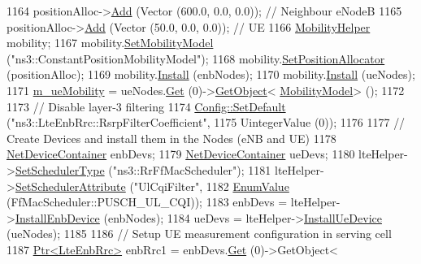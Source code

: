 \begin{DoxyCode}
1164   positionAlloc->\hyperlink{classns3_1_1ListPositionAllocator_a460e82f015ac012a73ba0ea0cccb3486}{Add} (Vector (600.0, 0.0, 0.0)); \textcolor{comment}{// Neighbour eNodeB}
1165   positionAlloc->\hyperlink{classns3_1_1ListPositionAllocator_a460e82f015ac012a73ba0ea0cccb3486}{Add} (Vector (50.0, 0.0, 0.0)); \textcolor{comment}{// UE}
1166   \hyperlink{classns3_1_1MobilityHelper}{MobilityHelper} mobility;
1167   mobility.\hyperlink{classns3_1_1MobilityHelper_a030275011b6f40682e70534d30280aba}{SetMobilityModel} (\textcolor{stringliteral}{"ns3::ConstantPositionMobilityModel"});
1168   mobility.\hyperlink{classns3_1_1MobilityHelper_ac59d5295076be3cc11021566713a28c5}{SetPositionAllocator} (positionAlloc);
1169   mobility.\hyperlink{classns3_1_1MobilityHelper_a07737960ee95c0777109cf2994dd97ae}{Install} (enbNodes);
1170   mobility.\hyperlink{classns3_1_1MobilityHelper_a07737960ee95c0777109cf2994dd97ae}{Install} (ueNodes);
1171   \hyperlink{classLteUeMeasurementsPiecewiseTestCase2_a085c911b012df1a52dde2bb903ba56e3}{m\_ueMobility} = ueNodes.\hyperlink{classns3_1_1NodeContainer_a9ed96e2ecc22e0f5a3d4842eb9bf90bf}{Get} (0)->\hyperlink{classns3_1_1Object_a13e18c00017096c8381eb651d5bd0783}{GetObject}<
      \hyperlink{classns3_1_1MobilityModel}{MobilityModel}> ();
1172 
1173   \textcolor{comment}{// Disable layer-3 filtering}
1174   \hyperlink{group__config_ga2e7882df849d8ba4aaad31c934c40c06}{Config::SetDefault} (\textcolor{stringliteral}{"ns3::LteEnbRrc::RsrpFilterCoefficient"},
1175                       UintegerValue (0));
1176 
1177   \textcolor{comment}{// Create Devices and install them in the Nodes (eNB and UE)}
1178   \hyperlink{classns3_1_1NetDeviceContainer}{NetDeviceContainer} enbDevs;
1179   \hyperlink{classns3_1_1NetDeviceContainer}{NetDeviceContainer} ueDevs;
1180   lteHelper->\hyperlink{classns3_1_1LteHelper_a8f86e55b8b80a81732c4b2df00fb25d5}{SetSchedulerType} (\textcolor{stringliteral}{"ns3::RrFfMacScheduler"});
1181   lteHelper->\hyperlink{classns3_1_1LteHelper_a38f8c7f4592b31c0f3dedb53e7909742}{SetSchedulerAttribute} (\textcolor{stringliteral}{"UlCqiFilter"},
1182                                     \hyperlink{classns3_1_1EnumValue}{EnumValue} (FfMacScheduler::PUSCH\_UL\_CQI));
1183   enbDevs = lteHelper->\hyperlink{classns3_1_1LteHelper_a5e009ad35ef85f46b5a6099263f15a03}{InstallEnbDevice} (enbNodes);
1184   ueDevs = lteHelper->\hyperlink{classns3_1_1LteHelper_ac9cd932d7de92811cfa953c2e3b2fc9f}{InstallUeDevice} (ueNodes);
1185 
1186   \textcolor{comment}{// Setup UE measurement configuration in serving cell}
1187   \hyperlink{classns3_1_1Ptr}{Ptr<LteEnbRrc>} enbRrc1 = enbDevs.\hyperlink{classns3_1_1NetDeviceContainer_a677d62594b5c9d2dea155cc5045f4d0b}{Get} (0)->GetObject<

\end{DoxyCode}
